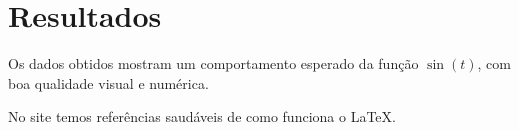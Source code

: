 \section{Resultados}
Os dados obtidos mostram um comportamento esperado da função $\sin(t)$, com boa qualidade visual e numérica.

No site \cite{site-latex} temos referências saudáveis de como funciona o \LaTeX.

